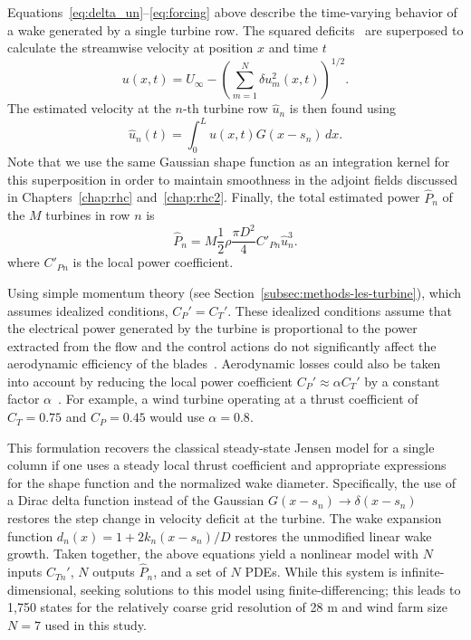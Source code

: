 Equations~\eqref{eq:delta_un}--\eqref{eq:forcing} above describe the time-varying behavior of a wake generated by a single turbine row. The squared deficits~\cite{Katic1986a} are superposed to calculate the streamwise velocity at position $x$ and time $t$
\begin{equation}
\label{eq:u}
u(x,t) = U_\infty - \left(\sum_{m=1}^N \delta u_m^2(x,t)\right)^{1/2}.
\end{equation}
The estimated velocity at the $n$-th turbine row $\hat{u}_n$ is then found using
\begin{equation}
\label{eq:estimated_velocity} 
\hat{u}_n (t) = \int_0^L  u(x,t) G(x - s_n) \, dx.
\end{equation}
Note that we use the same Gaussian shape function as an integration kernel for this superposition in order to maintain smoothness in the adjoint fields discussed in Chapters~\ref{chap:rhc} and~\ref{chap:rhc2}. Finally, the total estimated power $\hat{P}_n$ of the $M$ turbines in row $n$ is
\begin{equation}
\label{eq:estimated_power_row}
\hat{P}_n =  M \frac{1}{2}\rho \frac{\pi D^2}{4} C'_{Pn} \hat{u}_n^3.
\end{equation}
where $C'_{Pn}$ is the local power coefficient. 

Using simple momentum theory (see Section~\ref{subsec:methods-les-turbine}), which assumes idealized conditions, $C_P' = C_T'$.  These idealized conditions assume that the electrical power generated by the turbine is proportional to the power extracted from the flow and the control actions do not significantly affect the aerodynamic efficiency of the blades~\cite[Appendix A]{Goit2015a}. Aerodynamic losses could also be taken into account by reducing the local power coefficient $C_P' \approx \alpha C_T'$ by a constant factor $\alpha$~\cite{Stevens2014b}. For example, a wind turbine operating at a thrust coefficient of $C_T = 0.75$ and $C_P = 0.45$ would use $\alpha = 0.8$. 

This formulation recovers the classical steady-state Jensen model for a single column if one uses a steady local thrust coefficient and appropriate expressions for the shape function and the normalized wake diameter. Specifically, the use of a Dirac delta function instead of the Gaussian $G(x-s_n) \to \delta(x-s_n)$ restores the step change in velocity deficit at the turbine. The wake expansion function $d_n(x) = 1 + 2k_n(x-s_n)/D$ restores the unmodified linear wake growth. Taken together, the above equations yield a nonlinear model with $N$ inputs $C_{Tn}'$, $N$ outputs $\hat{P}_n$, and a set of $N$ PDEs. While this system is infinite-dimensional, seeking solutions to this model using finite-differencing; this leads to 1,750 states for the relatively coarse grid resolution of 28 m and wind farm size $N=7$ used in this study.

